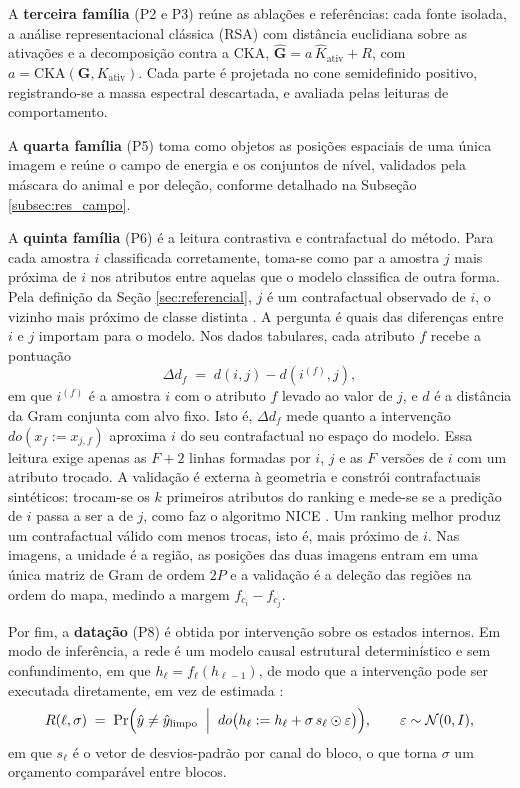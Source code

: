 A \textbf{terceira família} (P2 e P3) reúne as ablações e referências: cada fonte isolada, a análise representacional clássica (RSA) com distância euclidiana sobre as ativações e a decomposição contra a CKA, $\hat{\mathbf{G}} = a\,\hat{K}_{\mathrm{ativ}} + R$, com $a = \mathrm{CKA}(\mathbf{G}, K_{\mathrm{ativ}})$. Cada parte é projetada no cone semidefinido positivo, registrando-se a massa espectral descartada, e avaliada pelas leituras de comportamento.

A \textbf{quarta família} (P5) toma como objetos as posições espaciais de uma única imagem e reúne o campo de energia e os conjuntos de nível, validados pela máscara do animal e por deleção, conforme detalhado na Subseção \ref{subsec:res_campo}.

A \textbf{quinta família} (P6) é a leitura contrastiva e contrafactual do método. Para cada amostra $i$ classificada corretamente, toma-se como par a amostra $j$ mais próxima de $i$ nos atributos entre aquelas que o modelo classifica de outra forma. Pela definição da Seção \ref{sec:referencial}, $j$ é um contrafactual observado de $i$, o vizinho mais próximo de classe distinta \citep{KeaneSmyth2020}. A pergunta é quais das diferenças entre $i$ e $j$ importam para o modelo. Nos dados tabulares, cada atributo $f$ recebe a pontuação
\begin{equation}\label{eq:delta_d}
    \Delta d_f \;=\; d(i,j) - d(i^{(f)},j),
\end{equation}
em que $i^{(f)}$ é a amostra $i$ com o atributo $f$ levado ao valor de $j$, e $d$ é a distância da Gram conjunta com alvo fixo. Isto é, $\Delta d_f$ mede quanto a intervenção $do(x_f := x_{j,f})$ aproxima $i$ do seu contrafactual no espaço do modelo. Essa leitura exige apenas as $F + 2$ linhas formadas por $i$, $j$ e as $F$ versões de $i$ com um atributo trocado. A validação é externa à geometria e constrói contrafactuais sintéticos: trocam-se os $k$ primeiros atributos do ranking e mede-se se a predição de $i$ passa a ser a de $j$, como faz o algoritmo NICE \citep{Brughmans2024}. Um ranking melhor produz um contrafactual válido com menos trocas, isto é, mais próximo de $i$. Nas imagens, a unidade é a região, as posições das duas imagens entram em uma única matriz de Gram de ordem $2P$ e a validação é a deleção das regiões na ordem do mapa, medindo a margem $f_{c_i} - f_{c_j}$.

Por fim, a \textbf{datação} (P8) é obtida por intervenção sobre os estados internos. Em modo de inferência, a rede é um modelo causal estrutural determinístico e sem confundimento, em que $h_\ell = f_\ell(h_{\ell-1})$, de modo que a intervenção pode ser executada diretamente, em vez de estimada \citep{Pearl2009}:
\begin{equation}\label{eq:intervencao}
    R(\ell,\sigma) \;=\; \Pr\Bigl(\hat{y} \neq \hat{y}_{\text{limpo}}
    \;\Bigm|\; do\bigl(h_\ell := h_\ell + \sigma\,s_\ell \odot \varepsilon\bigr)\Bigr),
    \qquad \varepsilon \sim \mathcal{N}(0, I),
\end{equation}
em que $s_\ell$ é o vetor de desvios-padrão por canal do bloco, o que torna $\sigma$ um orçamento comparável entre blocos.


